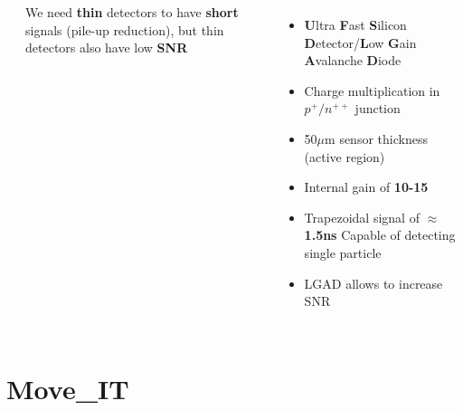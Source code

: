 \documentclass[aspectratio=169]{beamer}
\begin{document}
\begin{frame}
\begin{columns}
\begin{columns}
\begin{center}
			\end{center}
		\begin{center}
			We need \textbf{thin} detectors to have \textbf{short} signals (pile-up reduction), but thin detectors also have low \textbf{SNR}
		\end{center}
	\end{columns}
		\begin{itemize}
			\item \textbf{U}ltra \textbf{F}ast \textbf{S}ilicon \textbf{D}etector/\textbf{L}ow \textbf{G}ain \textbf{A}valanche \textbf{D}iode
			\item Charge multiplication in $p^+ / n^{++}$ junction 
			\item 50$\mu$m sensor thickness (active region)
			\item Internal gain of \textbf{10-15} 
			\item Trapezoidal signal of $\approx$\textbf{1.5ns}\newline
				{\color{blue} Capable of detecting single particle }
			\item LGAD allows to increase SNR 
		\end{itemize}
	\end{columns}
	\end{frame}

	\section{Move\_IT}
	
\end{document}
